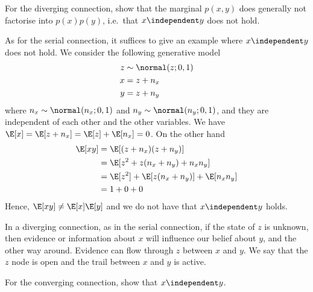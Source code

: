 \begin{exenumerate}
 \item For the diverging connection, show that the marginal $p(x,y)$
   does generally not factorise into $p(x)p(y)$, i.e.\ that $x \independent y$ does not
   hold.

   \begin{solution}
     As for the serial connection, it suffices to give an example
     where $x \independent y$ does not hold. We consider the following
     generative model
     \begin{align}
         z & \sim \normal(z; 0, 1)\\
         x &= z + n_x\\
         y &= z + n_y
       \end{align}
     where $n_x \sim \normal(n_x; 0, 1)$ and $n_y \sim \normal(n_y; 0,
     1)$, and they are independent of each other and the other
     variables. We have $\E[x] = \E[z + n_x] = \E[z]+\E[n_x]=0$. On
     the other hand
     \begin{align}
       \E[x y] & = \E[(z + n_x)( z + n_y)]\\
       & = \E[z^2 + z(n_x+n_y) + n_xn_y]\\
       & = \E[z^2] +  \E[z(n_x+n_y)] +  \E[n_xn_y]\\
       & = 1 + 0 + 0
     \end{align}
     Hence, $\E[xy] \neq \E[x]\E[y]$ and we do not have that $x
     \independent y$ holds.

     In a diverging connection, as in the serial connection, if
     the state of $z$ is unknown, then evidence or information about
     $x$ will influence our belief about $y$, and the other way
     around. Evidence can flow through $z$ between $x$ and $y$. We say
     that the $z$ node is open and the trail between $x$ and $y$ is
     active.
   \end{solution}

 \item For the converging connection, show that $x \independent y$.


\end{exenumerate}
